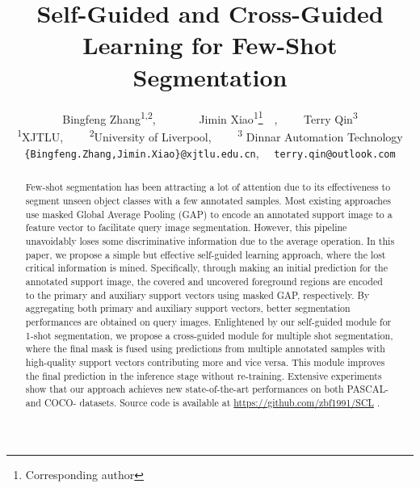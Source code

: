 \documentclass[final]{cvpr}
\begin{document}
\title{Self-Guided and Cross-Guided Learning for Few-Shot Segmentation}

\author{Bingfeng Zhang\textsuperscript{1,2},~~~~~~~
	Jimin Xiao\textsuperscript{1}\thanks{Corresponding author}~~,~~~~
	Terry Qin\textsuperscript{3}\\
{\textsuperscript{1}XJTLU,~~~~}
{\textsuperscript{2}University of Liverpool,~~~~}
{\textsuperscript{3} Dinnar Automation Technology}\\
{\tt\small \{Bingfeng.Zhang,Jimin.Xiao\}@xjtlu.edu.cn},~~ {\tt\small terry.qin@outlook.com}\\
}


\maketitle
\pagestyle{empty}
\thispagestyle{empty}

\begin{abstract}
Few-shot segmentation has been attracting a lot of attention due to its effectiveness to segment unseen object classes with a few annotated samples. Most existing approaches use masked Global Average Pooling (GAP) to encode an annotated support image to a feature vector to facilitate query image segmentation.
   However, this pipeline unavoidably loses some discriminative information due to the average operation. 
In this paper, we propose a simple but effective self-guided learning approach, where the lost critical information is mined. Specifically, through making an initial prediction for the annotated support image, the covered and uncovered foreground regions are encoded to the primary and auxiliary support vectors using masked GAP, respectively. By aggregating both primary and auxiliary support vectors, better segmentation performances are obtained on query images. 
Enlightened by our self-guided module for 1-shot segmentation, we propose a cross-guided module for multiple shot segmentation, where the final mask is fused using predictions from multiple annotated samples with high-quality support vectors contributing more and vice versa. 
   This module improves the final prediction in the inference stage without re-training.  
Extensive experiments show that our approach achieves new state-of-the-art performances on both PASCAL- and COCO- datasets. Source code is available at \href{https://github.com/zbf1991/SCL}{https://github.com/zbf1991/SCL}
   .
\end{abstract}
\end{document}
